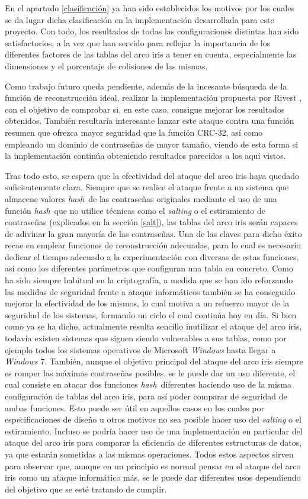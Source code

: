 \documentclass[12pt,spanish,listoffigures,listoftables,listofalgorithms]{tfgetsinf}
\newcommand{\hash}{\textit{hash}}
\begin{document}
En el apartado \ref{clasificación} ya han sido establecidos los motivos por los cuales se da lugar dicha clasificación en la implementación desarrollada para este proyecto. Con todo, los resultados de todas las configuraciones distintas han sido satisfactorios, a la vez que han servido para reflejar la importancia de los diferentes factores de las tablas del arco iris a tener en cuenta, especialmente las dimensiones y el porcentaje de colisiones de las mismas.

Como trabajo futuro queda pendiente, además de la incesante búsqueda de la función de reconstrucción ideal, realizar la implementación propuesta por Rivest \cite{rivest}, con el objetivo de comprobar si, en este caso, consigue mejorar los resultados obtenidos. También resultaría interesante lanzar este ataque contra una función resumen que ofrezca mayor seguridad que la función CRC-32, así como empleando un dominio de contraseñas de mayor tamaño, viendo de esta forma si la implementación continúa obteniendo resultados parecidos a los aquí vistos.

Tras todo esto, se espera que la efectividad del ataque del arco iris haya quedado suficientemente clara. Siempre que se realice el ataque frente a un sistema que almacene valores \hash~de las contraseñas originales mediante el uso de una función \hash~que no utilice técnicas como el \textit{salting} o el estiramiento de contraseñas (explicados en la sección \ref{salt}), las tablas del arco iris serán capaces de adivinar la gran mayoría de las contraseñas. Una de las claves para dicho éxito recae en emplear funciones de reconstrucción adecuadas, para lo cual es necesario dedicar el tiempo adecuado a la experimentación con diversas de estas funciones, así como los diferentes parámetros que configuran una tabla en concreto. Como ha sido siempre habitual en la criptografía, a medida que se han ido reforzando las medidas de seguridad frente a ataque informáticos también se ha conseguido mejorar la efectividad de los mismos, lo cual motiva a un refuerzo mayor de la seguridad de los sistemas, formando un ciclo el cual continúa hoy en día. Si bien como ya se ha dicho, actualmente resulta sencillo inutilizar el ataque del arco iris, todavía existen sistemas que siguen siendo vulnerables a sus tablas, como por ejemplo todos los sistemas operativos de Microsoft \textit{Windows} hasta llegar a \textit{Windows} 7. También, aunque el objetivo principal del ataque del arco iris siempre es romper las máximas contraseñas posibles, se le puede dar un uso diferente, el cual consiste en atacar dos funciones \hash~diferentes haciendo uso de la misma configuración de tablas del arco iris, para así poder comparar de seguridad de ambas funciones. Esto puede ser útil en aquellos casos en los cuales por especificaciones de diseño u otros motivos no sea posible hacer uso del \textit{salting} o el estiramiento. Incluso se podría hacer uso de una implementación en particular del ataque del arco iris para comparar la eficiencia de diferentes estructuras de datos, ya que estarán sometidas a las mismas operaciones. Todos estos aspectos sirven para observar que, aunque en un principio es normal pensar en el ataque del arco iris como un ataque informático más, se le puede dar diferentes usos dependiendo del objetivo que se esté tratando de cumplir.
\end{document}
